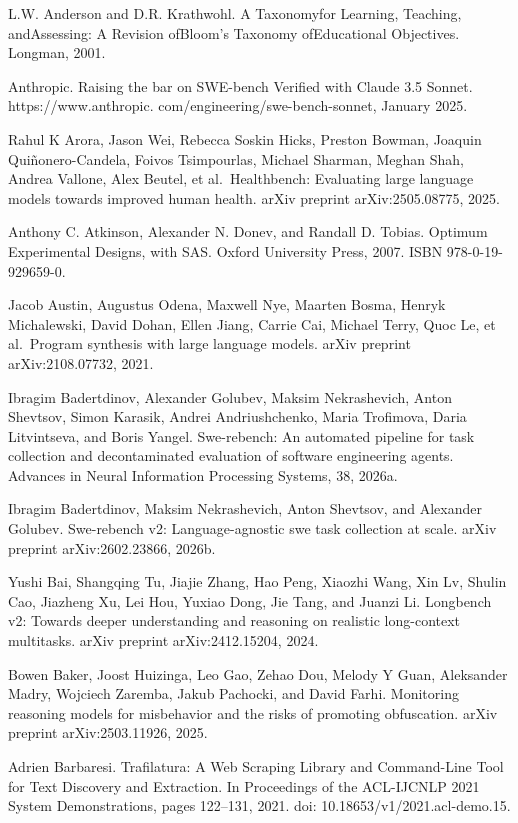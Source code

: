 \documentclass[
  10
]{article}
\begin{document}
L.W. Anderson and D.R. Krathwohl. A Taxonomyfor Learning, Teaching,
andAssessing: A Revision ofBloom's Taxonomy ofEducational Objectives.
Longman, 2001.

Anthropic. Raising the bar on SWE-bench Verified with Claude 3.5 Sonnet.
https://www.anthropic. com/engineering/swe-bench-sonnet, January 2025.

Rahul K Arora, Jason Wei, Rebecca Soskin Hicks, Preston Bowman, Joaquin
Quiñonero-Candela, Foivos Tsimpourlas, Michael Sharman, Meghan Shah,
Andrea Vallone, Alex Beutel, et al.~Healthbench: Evaluating large
language models towards improved human health. arXiv preprint
arXiv:2505.08775, 2025.

Anthony C. Atkinson, Alexander N. Donev, and Randall D. Tobias. Optimum
Experimental Designs, with SAS. Oxford University Press, 2007. ISBN
978-0-19-929659-0.

Jacob Austin, Augustus Odena, Maxwell Nye, Maarten Bosma, Henryk
Michalewski, David Dohan, Ellen Jiang, Carrie Cai, Michael Terry, Quoc
Le, et al.~Program synthesis with large language models. arXiv preprint
arXiv:2108.07732, 2021.

Ibragim Badertdinov, Alexander Golubev, Maksim Nekrashevich, Anton
Shevtsov, Simon Karasik, Andrei Andriushchenko, Maria Trofimova, Daria
Litvintseva, and Boris Yangel. Swe-rebench: An automated pipeline for
task collection and decontaminated evaluation of software engineering
agents. Advances in Neural Information Processing Systems, 38, 2026a.

Ibragim Badertdinov, Maksim Nekrashevich, Anton Shevtsov, and Alexander
Golubev. Swe-rebench v2: Language-agnostic swe task collection at scale.
arXiv preprint arXiv:2602.23866, 2026b.

Yushi Bai, Shangqing Tu, Jiajie Zhang, Hao Peng, Xiaozhi Wang, Xin Lv,
Shulin Cao, Jiazheng Xu, Lei Hou, Yuxiao Dong, Jie Tang, and Juanzi Li.
Longbench v2: Towards deeper understanding and reasoning on realistic
long-context multitasks. arXiv preprint arXiv:2412.15204, 2024.

Bowen Baker, Joost Huizinga, Leo Gao, Zehao Dou, Melody Y Guan,
Aleksander Madry, Wojciech Zaremba, Jakub Pachocki, and David Farhi.
Monitoring reasoning models for misbehavior and the risks of promoting
obfuscation. arXiv preprint arXiv:2503.11926, 2025.

Adrien Barbaresi. Trafilatura: A Web Scraping Library and Command-Line
Tool for Text Discovery and Extraction. In Proceedings of the ACL-IJCNLP
2021 System Demonstrations, pages 122--131, 2021. doi:
10.18653/v1/2021.acl-demo.15.
\end{document}
